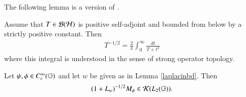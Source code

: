 \documentclass[leqno]{amsart}
\begin{document}
	
	The following lemma is a version of \cite[Lemma 3.5.2]{DAO4}.
	\begin{lemma}\label{deltadecomo}
		Assume that $T\in{\mathcal B}({\mathcal H})$ is positive self-adjoint and bounded from below by a strictly positive constant. Then
		\begin{align*}
			T^{-1/2}=\frac{2}{\pi}\int_{0}^{\infty}\frac{dt}{T+t^{2}}
		\end{align*}
		where this integral is understood in the sense of strong operator topology.
	\end{lemma}
	
	
	
	\begin{lemma}\label{tail2-compact}
		Let $\psi,\phi\in C_{c}^{\infty}(\mathbb{G})$ and let $w$ be given as in Lemma \ref{laplacinbd}. Then
		\begin{align*}
			[M_{\psi},(1+L_{w})^{1/2}](1+L_{w})^{-1/2}M_{\phi}\in\K(\lp{2}).
		\end{align*}
	\end{lemma}
\end{document}
